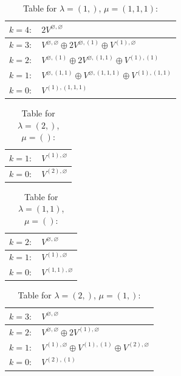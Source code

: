 \renewcommand{\arraystretch}{1.6} 
\begin{table}[H]
\centering
\caption{Table for $\lambda = (1,)$, $\mu = (1, 1, 1)$:}
\begin{tabular}{|>{\centering\arraybackslash}p{15cm}|}
\hline
 $k = 4: \quad 2 V^{\varnothing, \varnothing} $ \\ \hline
 $k = 3: \quad V^{\varnothing, \varnothing} \oplus 2 V^{\varnothing, (1)} \oplus V^{(1), \varnothing} $ \\ \hline
 $k = 2: \quad V^{\varnothing, (1)} \oplus 2 V^{\varnothing, (1, 1)} \oplus V^{(1), (1)} $ \\ \hline
 $k = 1: \quad V^{\varnothing, (1, 1)} \oplus V^{\varnothing, (1, 1, 1)} \oplus V^{(1), (1, 1)} $ \\ \hline
 $k = 0: \quad V^{(1), (1, 1, 1)} $ \\ \hline
\end{tabular}
\end{table}

\renewcommand{\arraystretch}{1.6} 
\begin{table}[H]
\centering
\caption{Table for $\lambda = (2,)$, $\mu = ()$:}
\begin{tabular}{|>{\centering\arraybackslash}p{15cm}|}
\hline
 $k = 1: \quad V^{(1), \varnothing} $ \\ \hline
 $k = 0: \quad V^{(2), \varnothing} $ \\ \hline
\end{tabular}
\end{table}

\renewcommand{\arraystretch}{1.6} 
\begin{table}[H]
\centering
\caption{Table for $\lambda = (1, 1)$, $\mu = ()$:}
\begin{tabular}{|>{\centering\arraybackslash}p{15cm}|}
\hline
 $k = 2: \quad V^{\varnothing, \varnothing} $ \\ \hline
 $k = 1: \quad V^{(1), \varnothing} $ \\ \hline
 $k = 0: \quad V^{(1, 1), \varnothing} $ \\ \hline
\end{tabular}
\end{table}

\renewcommand{\arraystretch}{1.6} 
\begin{table}[H]
\centering
\caption{Table for $\lambda = (2,)$, $\mu = (1,)$:}
\begin{tabular}{|>{\centering\arraybackslash}p{15cm}|}
\hline
 $k = 3: \quad V^{\varnothing, \varnothing} $ \\ \hline
 $k = 2: \quad V^{\varnothing, \varnothing} \oplus 2 V^{(1), \varnothing} $ \\ \hline
 $k = 1: \quad V^{(1), \varnothing} \oplus V^{(1), (1)} \oplus V^{(2), \varnothing} $ \\ \hline
 $k = 0: \quad V^{(2), (1)} $ \\ \hline
\end{tabular}
\end{table}

